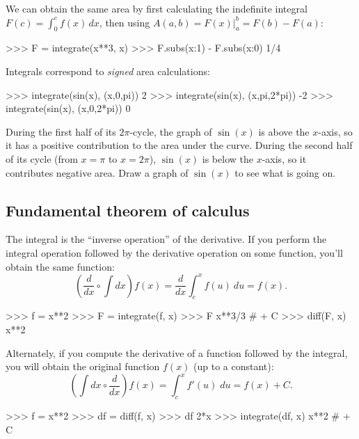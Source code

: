 \noindent
We can obtain the same area by first calculating the indefinite integral $F(c)=\int_0^c \!f(x)\,dx$,
then using $A(a,b) = F(x)\big\vert_a^b = F(b) - F(a)$:



\small
\begin{verbatimtab}
>>> F = integrate(x**3, x)
>>> F.subs({x:1}) - F.subs({x:0})   
1/4
\end{verbatimtab}
\normalsize
Integrals correspond to \emph{signed} area calculations:



\small
\begin{verbatimtab}
>>> integrate(sin(x), (x,0,pi))
2
>>> integrate(sin(x), (x,pi,2*pi))
-2
>>> integrate(sin(x), (x,0,2*pi))
0
\end{verbatimtab}
\normalsize

\noindent
During the first half of its $2\pi$-cycle,
the graph of $\sin(x)$ is above the $x$-axis, so it has a positive contribution to the area under the curve.
During the second half of its cycle (from $x=\pi$ to $x=2\pi$),
$\sin(x)$ is below the $x$-axis, so it contributes negative area.
Draw a graph of $\sin(x)$ to see what is going on. 

\subsection{Fundamental theorem of calculus}
\label{calculus:fundamental_theorem_of_calculus}
The integral is the ``inverse operation'' of the derivative.			
If you perform the integral operation followed by the derivative operation on some function,
you'll obtain the same function:
\[
  \left(\frac{d}{dx} \circ \int dx \right) f(x) = \frac{d}{dx} \int_c^x f(u)\:du = f(x).
\]



\small
\begin{verbatimtab}
>>> f = x**2
>>> F = integrate(f, x)
>>> F
x**3/3           # + C
>>> diff(F, x)
x**2
\end{verbatimtab}
\normalsize

\noindent
Alternately, if you compute the derivative of a function followed by the integral,
you will obtain the original function $f(x)$ (up to a constant):
\[
  \left( \int dx \circ \frac{d}{dx}\right) f(x) = \int_c^x f'(u)\;du = f(x) + C.
\]



\small
\begin{verbatimtab}
>>> f = x**2
>>> df = diff(f, x)
>>> df
2*x
>>> integrate(df, x)
x**2    # + C
\end{verbatimtab}
\normalsize


